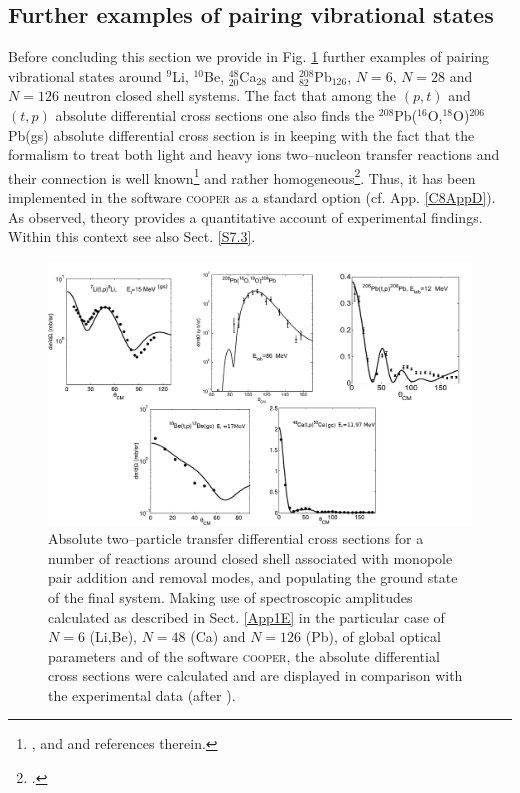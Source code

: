  \subsection{Further examples of pairing vibrational states}\label{C6S1.2}
 Before concluding this section we provide in Fig. \ref{fig8_2_1} further examples of pairing vibrational states around $^9$Li, $^{10}$Be, $^{48}_{20}$Ca$_{28}$ and $^{208}_{82}$Pb$_{126}$, $N=6$,  $N=28$ and $N=126$ neutron closed shell systems. The fact that among the $(p,t)$ and $(t,p)$ absolute differential cross sections one also finds the $^{208}$Pb($^{16}$O,$^{18}$O)$^{206}$Pb(gs) absolute differential cross section is in keeping with the fact that the formalism to treat both light and heavy ions two--nucleon transfer reactions and their connection is well known\footnote{\cite{Broglia:04a}, \cite{Bayman:82} and  \cite{Thompson:88} and references therein.} and rather homogeneous\footnote{\cite{Potel:13,Potel:13b}.}. Thus, it has been implemented in the software \textsc{cooper} as a standard option (cf. App. \ref{C8AppD}). As observed, theory provides a quantitative account of experimental findings. Within this context see also Sect. \ref{S7.3}.
 \begin{figure}
 	\centerline{\includegraphics*[width=18cm,angle=0]{C8/figsC8/fig8_1_5}}
 	\caption{Absolute two--particle transfer differential cross sections for a number of reactions around closed shell associated with monopole pair addition and removal modes, and populating the ground state of the final system. Making use of spectroscopic amplitudes calculated as described in Sect. \ref{App1E} in the particular case of $N=6$ (Li,Be), $N=48$ (Ca) and  $N=126$ (Pb), of global optical parameters and of the software \textsc{cooper}, the absolute differential cross sections were calculated and are displayed in comparison with the experimental data (after \cite{Potel:13}).}\label{fig8_2_1}
 \end{figure}
 
